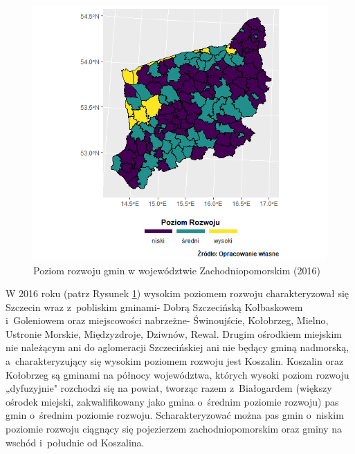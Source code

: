 \documentclass{amuthesis}
\begin{document}
\begin{figure}[t]

{\centering \includegraphics[width=1\linewidth]{figures/mapa_2016_bez} 

}

\caption{Poziom rozwoju gmin w województwie Zachodniopomorskim (2016)}\label{fig:rycina6}
\end{figure}

W 2016 roku (patrz Rysunek \ref{fig:rycina6}) wysokim poziomem rozwoju charakteryzował się Szczecin wraz z~pobliskim gminami- Dobrą Szczecińską Kołbaskowem i~Goleniowem oraz miejscowości nabrzeżne- Świnoujście, Kołobrzeg, Mielno, Ustronie Morskie, Międzyzdroje, Dziwnów, Rewal. Drugim ośrodkiem miejskim nie należącym ani do aglomeracji Szczecińskiej ani nie będący gminą nadmorską, a~charakteryzujący się wysokim poziomem rozwoju jest Koszalin.
Koszalin oraz Kołobrzeg są gminami na północy województwa, których wysoki poziom rozwoju „dyfuzyjnie" rozchodzi się na powiat, tworząc razem z~Białogardem (większy ośrodek miejski, zakwalifikowany jako gmina o~średnim poziomie rozwoju) pas gmin o~średnim poziomie rozwoju.
Scharakteryzować można pas gmin o~niskim poziomie rozwoju ciągnący się pojezierzem zachodniopomorskim oraz gminy na wschód i~południe od Koszalina.
\end{document}
